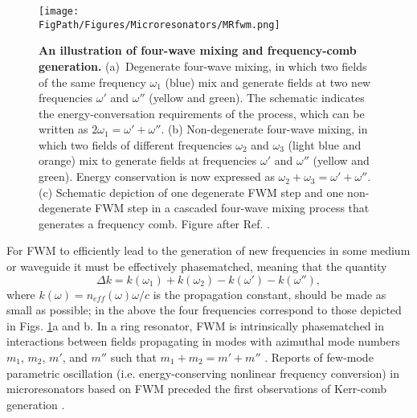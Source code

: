 \begin{figure}[htpb]
	\begin{center}
		\texttt{[image: \\FigPath/Figures/Microresonators/MRfwm.png]}
	\end{center}
	\caption[An illustration of four-wave mixing and frequency-comb generation.]{\textbf{An illustration of four-wave mixing and frequency-comb generation.} (a)~Degenerate four-wave mixing, in which two fields of the same frequency $\omega_1$ (blue) mix and generate fields at two new frequencies $\omega'$ and $\omega''$ (yellow and green). The schematic indicates the energy-conversation requirements of the process, which can be written as $2\omega_1=\omega'+\omega''$. (b) Non-degenerate four-wave mixing, in which two fields of different frequencies $\omega_2$ and $\omega_3$ (light blue and orange) mix to generate fields at frequencies $\omega'$ and $\omega''$ (yellow and green). Energy conservation is now expressed as $\omega_2+\omega_3=\omega'+\omega''$. (c) Schematic depiction of one degenerate FWM step and one non-degenerate FWM step in a cascaded four-wave mixing process that generates a frequency comb. \footnotesize{Figure after Ref. .}}
	
	\label{fig:MRfwm}
\end{figure} 

For FWM to efficiently lead to the generation of new frequencies in some medium or waveguide it must be effectively phasematched, meaning that the quantity \cite{Stolen1982}
\begin{equation}
\Delta k=k(\omega_1)+k(\omega_2)-k(\omega')-k(\omega''),
\end{equation}
where $k(\omega)=n_{eff}(\omega)\omega/c$ is the propagation constant, should be made as small as possible; in the above the four frequencies correspond to those depicted in Figs. \ref{fig:MRfwm}a and b. In a ring resonator, FWM is intrinsically phasematched in interactions between fields propagating in modes with azimuthal mode numbers $m_1$, $m_2$, $m'$, and $m''$ such that $m_1+m_2=m'+m''$ \cite{Kippenberg2004}. Reports of few-mode parametric oscillation (i.e. energy-conserving nonlinear frequency conversion) in microresonators based on FWM preceded the first observations of Kerr-comb generation \cite{Kippenberg2004, Savchenkov2004,Agha2007}.





